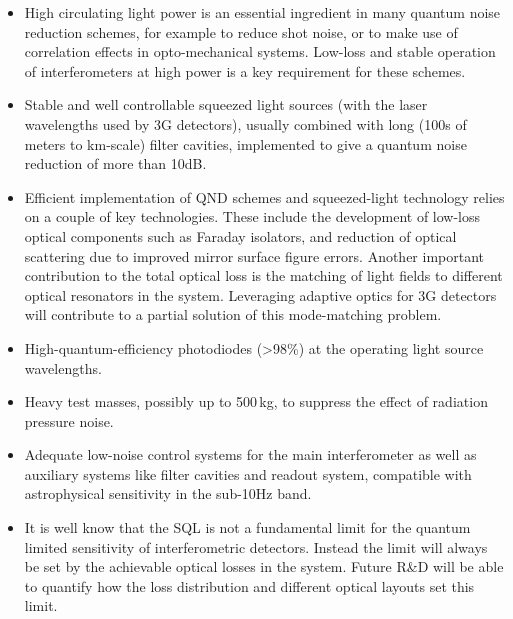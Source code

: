 \begin{itemize}
\item High circulating light power is an essential ingredient in many quantum noise reduction schemes, for example to reduce shot noise, or to make use of correlation effects in opto-mechanical systems. Low-loss and stable operation of interferometers at high power is a key requirement for these schemes.
\item Stable and well controllable squeezed light sources (with the laser wavelengths used by 3G detectors), usually combined with long (100s of meters to km-scale) filter cavities, implemented to give a quantum noise reduction of more than 10dB.
\item Efficient implementation of QND schemes and squeezed-light technology relies on a couple of key technologies. These include the development of low-loss optical components such as Faraday isolators, and reduction of optical scattering due to improved mirror surface figure errors. Another important contribution to the total optical loss is the matching of light fields to different optical resonators in the system. Leveraging adaptive optics for 3G detectors will contribute to a partial solution of this mode-matching problem. 
\item High-quantum-efficiency photodiodes (>98\%) at the operating light source wavelengths.
\item Heavy test masses, possibly up to 500\,kg, to suppress the effect of radiation pressure noise.
\item Adequate low-noise control systems for the main interferometer as well as auxiliary systems like filter cavities and readout system, compatible with astrophysical sensitivity in the sub-10Hz band.   
\item It is well know that the SQL is not a fundamental limit for the quantum limited sensitivity of interferometric detectors. Instead the limit will always be set by the achievable optical losses in the system. Future R\&D will be able to quantify how the loss distribution and different optical layouts set this limit.
\end{itemize}

